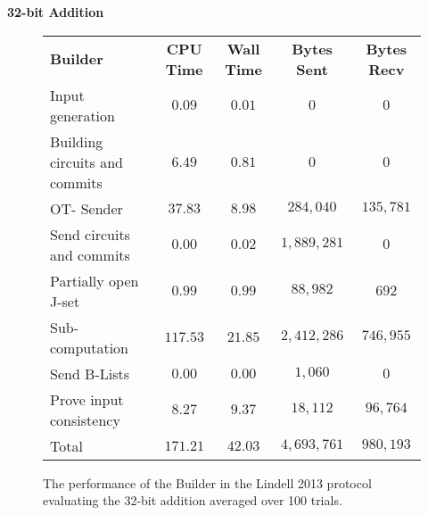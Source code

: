 \documentclass[ %
                    author={Nicholas Tutte},
                supervisor={Prof. Nigel Smart},
                    degree={MEng},
                     title={Secure Two Party Computation},
                  subtitle={A practical comparison of recent protocols},
                      type={Research - GG1K},
                      year={2015} ]{dissertation}
\begin{document}
				\FloatBarrier
				\noindent \textbf{32-bit Addition}
				\begin{figure}[!ht]
					\begin{tabular}{| p{4.3cm} | c c c c |}
						\hline
						\textbf{Builder} & \textbf{CPU Time} & \textbf{Wall Time} & \textbf{Bytes Sent} & \textbf{Bytes Recv} \\
						\thickhline
						Input generation & $0.09$ & $0.01$ & $0$ & $0$ \\
						\hline
						Building circuits and commits & $6.49$ & $0.81$ & $0$ & $0$ \\
						\hline
						OT- Sender & $37.83$ & $8.98$ & $284,040$ & $135,781$ \\
						\hline
						Send circuits and commits & $0.00$ & $0.02$ & $1,889,281$ & $0$ \\
						\hline
						Partially open J-set & $0.99$ & $0.99$ & $88,982$ & $692$ \\
						\hline
						Sub-computation & $117.53$ & $21.85$ & $2,412,286$ & $746,955$ \\
						\hline
						Send B-Lists & $0.00$ & $0.00$ & $1,060$ & $0$ \\
						\hline
						Prove input consistency & $8.27$ & $9.37$ & $18,112$ & $96,764$ \\
						\thickhline
						Total & $171.21$ & $42.03$ & $4,693,761$ & $980,193$ \\
						\hline
					\end{tabular}
					\caption{The performance of the Builder in the Lindell 2013 protocol evaluating the 32-bit addition averaged over 100 trials. \label{table:L_2013_Add_Builder}}
				\end{figure}
\end{document}

